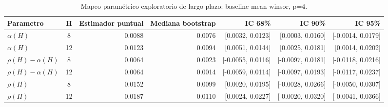\begin{table}

\caption{Mapeo paramétrico exploratorio de largo plazo: baseline mean winsor, p=4.}
\centering
\begin{tabular}[t]{lcrrrrr}
\toprule
Parametro & H & Estimador puntual & Mediana bootstrap & IC 68\% & IC 90\% & IC 95\%\\
\midrule
$\alpha(H)$ & 8 & 0.0088 & 0.0076 & {}[0.0032, 0.0123] & {}[0.0003, 0.0160] & {}[-0.0014, 0.0179]\\
$\alpha(H)$ & 12 & 0.0123 & 0.0094 & {}[0.0051, 0.0144] & {}[0.0025, 0.0181] & {}[0.0014, 0.0202]\\
$\rho(H)-\alpha(H)$ & 8 & 0.0064 & 0.0023 & {}[-0.0055, 0.0116] & {}[-0.0097, 0.0181] & {}[-0.0118, 0.0216]\\
$\rho(H)-\alpha(H)$ & 12 & 0.0064 & 0.0014 & {}[-0.0059, 0.0114] & {}[-0.0097, 0.0193] & {}[-0.0117, 0.0237]\\
$\rho(H)$ & 8 & 0.0152 & 0.0099 & {}[0.0020, 0.0195] & {}[-0.0028, 0.0266] & {}[-0.0050, 0.0307]\\
\addlinespace
$\rho(H)$ & 12 & 0.0187 & 0.0110 & {}[0.0024, 0.0227] & {}[-0.0020, 0.0320] & {}[-0.0041, 0.0366]\\
\bottomrule
\end{tabular}
\end{table}

